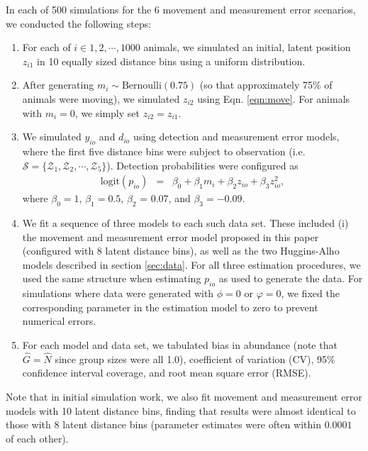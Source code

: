 \documentclass[aoas,preprint]{imsart}
\numberwithin{equation}{section}
\theoremstyle{plain}
\begin{document}
In each of 500 simulations for the 6 movement and measurement error scenarios, we conducted the following steps:
\begin{enumerate}
  \item For each of $i \in 1,2,\cdots,1000$ animals, we simulated an initial, latent position $z_{i1}$ in 10 equally sized distance bins using a uniform distribution.
  \item After generating $m_i \sim \text{Bernoulli}(0.75)$ (so that approximately 75\% of animals were moving), we simulated $z_{i2}$ using Eqn. \ref{eqn:move}.  For animals with $m_i=0$, we simply set $z_{i2}=z_{i1}$.
  \item We simulated $y_{io}$ and $d_{io}$ using detection and measurement error models, where the first five distance bins were subject to observation (i.e. $\mathcal{S} = \{ \mathcal{Z}_1, \mathcal{Z}_2, \cdots, \mathcal{Z}_5 \} $).  Detection probabilities were configured as
      \begin{eqnarray*}
        \text{logit}(p_{io}) & = & \beta_0 + \beta_1 m_i + \beta_2 z_{io} + \beta_3 z_{io}^2,
      \end{eqnarray*}
      where $\beta_0 = 1$, $\beta_1 = 0.5$, $\beta_2$ = 0.07, and $\beta_3 = -0.09$.
  \item We fit a sequence of three models to each such data set.  These included (i) the movement and measurement error model proposed in this paper (configured with 8 latent distance bins), as well as the two Huggins-Alho models described in section \ref{sec:data}. For all three estimation procedures, we used the same structure when estimating $p_{io}$ as used to generate the data.  For simulations where data were generated with $\phi=0$ or $\varphi=0$, we fixed the corresponding parameter in the estimation model to zero to prevent numerical errors.
  \item For each model and data set, we tabulated bias in abundance (note that $\hat{G}=\hat{N}$ since group sizes were all 1.0), coefficient of variation (CV), 95\% confidence interval coverage, and root mean square error (RMSE).
\end{enumerate}
Note that in initial simulation work, we also fit movement and measurement error models with 10 latent distance bins, finding that results were almost identical to those with 8 latent distance bins (parameter estimates were often within $0.0001$ of each other).
\end{document}
